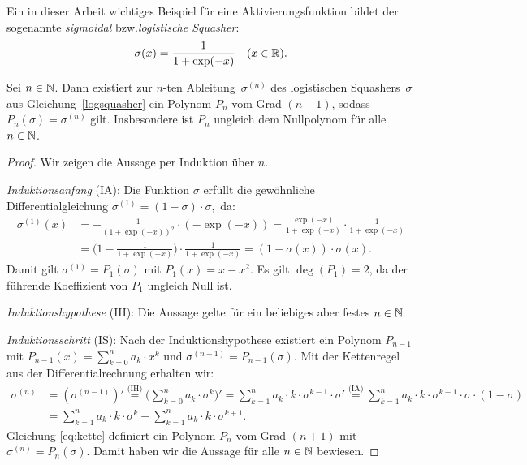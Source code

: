 Ein in dieser Arbeit wichtiges Beispiel für eine Aktivierungsfunktion bildet der sogenannte \emph{sigmoidal} bzw.\@ \emph{logistische Squasher}:
\begin{align}
\label{logsquasher}
\sigma(x) = \frac{1}{1 + \exp(-x)} \quad (x \in \mathbb{R}).
\end{align}
\begin{lem}
\label{lem:polynom}
Sei $n \in \mathbb{N}$. Dann existiert zur $n$-ten Ableitung~$\sigma^{(n)}$ des logistischen Squashers~$\sigma$ aus Gleichung~\eqref{logsquasher} ein Polynom $P_n$ vom Grad $(n + 1)$, sodass $P_n(\sigma) = \sigma^{(n)}$ gilt. Insbesondere ist $P_n$ ungleich dem Nullpolynom für alle $n \in \mathbb{N}$.
\end{lem}
\begin{proof}
    Wir zeigen die Aussage per Induktion über $n$.
    
    \emph{Induktionsanfang} (IA): 
    Die Funktion $\sigma$ erfüllt die gewöhnliche Differentialgleichung $\sigma^{(1)} = (1 - \sigma) \cdot \sigma,$ da:
\begin{equation*}
\begin{split}
\sigma^{(1)}(x) &= -\frac{1}{(1 + \exp(-x))^2} \cdot (-\exp(-x)) 
 = \frac{\exp(-x)}{1 + \exp(-x)} \cdot \frac{1}{1 + \exp(-x)} \\[0.5em]
& = \bigg(1 - \frac{1}{1 + \exp(-x)}\bigg) \cdot \frac{1}{1 + \exp(-x)} 
 = (1 - \sigma(x)) \cdot \sigma(x).
\end{split}
\end{equation*}
    Damit gilt $\sigma^{(1)} = P_1(\sigma)$ mit $P_1(x) = x - x^2.$ Es gilt $\operatorname{deg}(P_1) = 2$, da der führende Koeffizient von $P_1$ ungleich Null ist.
    
\emph{Induktionshypothese} (IH): Die Aussage gelte für ein beliebiges aber festes $n \in \mathbb{N}.$

\emph{Induktionsschritt} (IS): Nach der Induktionshypothese existiert ein Polynom $P_{n - 1}$ mit $P_{n - 1}(x) = \sum_{k = 0}^{n} a_k\cdot x^k$ und $\sigma^{(n - 1)} = P_{n - 1}(\sigma)$.
Mit der Kettenregel aus der Differentialrechnung erhalten wir:
\begin{align}
\sigma^{(n)} & = (\sigma^{(n - 1)})' \overset{\text{(IH)}}{=} \Big(\sum_{k = 0}^{n} a_k\cdot \sigma^k\Big)' = \sum_{k = 1}^{n} a_k \cdot k \cdot \sigma^{k- 1} \cdot \sigma' 
 \overset{\text{(IA)}}{=}  \sum_{k = 1}^{n} a_k \cdot k \cdot \sigma^{k- 1} \cdot \sigma \cdot (1 - \sigma) \nonumber \\[0.5em] 
& = \sum_{k = 1}^{n} a_k \cdot k \cdot \sigma^{k} - \sum_{k = 1}^{n} a_k \cdot k \cdot \sigma^{k + 1}. \label{eq:kette}
\end{align} 
Gleichung \eqref{eq:kette} definiert ein Polynom $P_n$ vom Grad $(n + 1)$ mit $\sigma^{(n)} = P_n(\sigma)$.
Damit haben wir die Aussage für alle $n \in \mathbb{N}$ bewiesen.
\end{proof}
